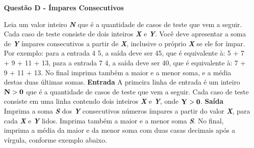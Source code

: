 \documentclass[a4paper, 12pt]{article}
\begin{document}
\newpage %
\begin{center}
\textbf{{\Large Questão D - Ímpares Consecutivos}}
\end{center}
\vspace{5pt}
Leia um valor inteiro \textbf{\textit{N}} que é a quantidade de casos de teste que vem a seguir. Cada caso de teste consiste de dois inteiros \textbf{\textit{X}} e \textbf{\textit{Y}}. Você deve apresentar a soma de \textbf{\textit{Y}} ímpares consecutivos a partir de \textbf{\textit{X}}, inclusive o próprio \textbf{\textit{X}} se ele for ímpar. Por exemplo: para a entrada 4 5, a saída deve ser 45, que é equivalente à: 5 + 7 + 9 + 11 + 13, para a entrada 7 4, a saída deve ser 40, que é equivalente à: 7 + 9 + 11 + 13. No final imprima também a maior e a menor soma, e a média destas duas últimas somas.
\newline \newline
\textbf{{\large Entrada}} \newline 
A primeira linha de entrada é um inteiro $\textrm{\textbf{N}} > \textrm{\textbf{0}}$ que é a quantidade de casos de teste que vem a seguir. Cada caso de teste consiste em uma linha contendo dois inteiros \textbf{\textit{X}} e \textbf{\textit{Y}}, onde $\textrm{\textbf{Y}} > \textrm{\textbf{0}}$.
\newline \newline
\textbf{{\large Saída}} \newline
Imprima a soma \textbf{\textit{S}} dos \textbf{\textit{Y}} consecutivos números ímpares a partir do valor \textbf{\textit{X}}, para cada \textbf{\textit{X}} e \textbf{\textit{Y}} lidos. Imprima também a maior e a menor soma \textbf{\textit{S}}. No final, imprima a média da maior e da menor soma com duas casas decimais após a vírgula, conforme exemplo abaixo.
\newline
\end{document}
